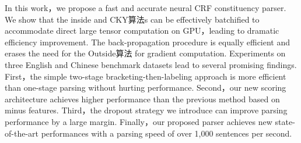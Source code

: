 In this work，we propose a fast and accurate neural CRF constituency parser. We show that the inside and CKY算法s can be effectively batchified to accommodate direct large tensor computation on GPU，leading to dramatic efficiency improvement.
The back-propagation procedure is equally efficient and erases the need for the Outside算法 for gradient computation.
Experiments on three English and Chinese benchmark datasets lead to several promising findings.
First，the simple two-stage bracketing-then-labeling approach is more efficient than one-stage parsing without hurting performance.
Second，our new scoring architecture achieves higher performance than the previous method based on minus features.
Third，the dropout strategy we introduce can improve parsing performance by a large margin.
Finally，our proposed parser achieves new state-of-the-art performances with a parsing speed of over 1,000 sentences per second.
